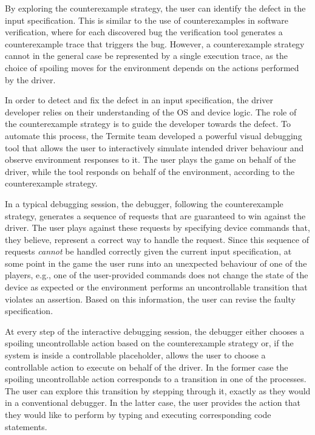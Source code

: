 By exploring the counterexample strategy, the user can identify the defect in the input specification.  This is similar to the use of counterexamples in software verification, where for each discovered bug the verification tool generates a counterexample trace that triggers the bug.  However, a counterexample strategy cannot in the general case be represented by a single execution trace, as the choice of spoiling moves for the environment depends on the actions performed by the driver.

In order to detect and fix the defect in an input specification, the driver developer relies on their  understanding of the OS and device logic.  The role of the counterexample strategy is to guide the developer towards the defect.  To automate this process, the Termite team developed a powerful visual debugging tool that allows the user to interactively simulate intended driver behaviour and observe environment responses to it.  The user plays the game on behalf of the driver, while the tool responds on behalf of the environment, according to the counterexample strategy.
 
In a typical debugging session, the debugger, following the counterexample strategy, generates a sequence of requests that are guaranteed to win against the driver.  The user plays against these requests by specifying device commands that, they believe, represent a correct way to handle the request.  Since this sequence of requests \emph{cannot} be handled correctly given the current input specification, at some point in the game the user runs into an unexpected behaviour of one of the players, e.g., one of the user-provided commands does not change the state of the device as expected or the environment performs an uncontrollable transition that violates an assertion.  Based on this information, the user can revise the faulty specification.

At every step of the interactive debugging session, the debugger either chooses a spoiling uncontrollable action based on the counterexample strategy or, if the system is inside a controllable placeholder, allows the user to choose a controllable action to execute on behalf of the driver.  In the former case the spoiling uncontrollable action corresponds to a transition in one of the \tsl processes.  The user can explore this transition by stepping through it, exactly as they would in a conventional debugger.  In the latter case, the user provides the action that they would like to perform by typing and executing corresponding code statements.

